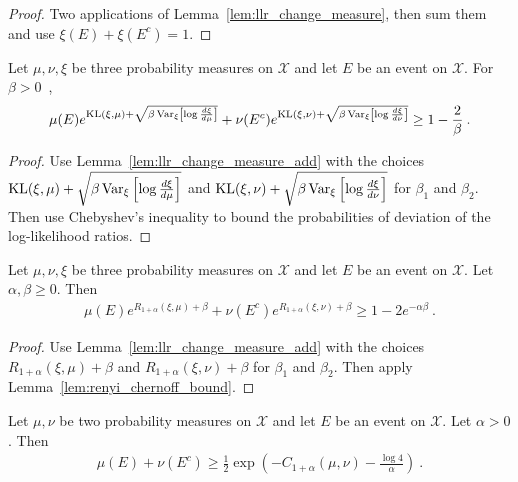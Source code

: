 \begin{proof}\leanok
{}
Two applications of Lemma~\ref{lem:llr_change_measure}, then sum them and use $\xi(E)+\xi(E^c) = 1$.
\end{proof}

\begin{lemma}
  \label{lem:change_measure_variance_add}
  \uses{}
  Let $\mu, \nu, \xi$ be three probability measures on $\mathcal X$ and let $E$ be an event on $\mathcal X$. For $\beta > 0$~,
  \begin{align*}
  \mu(E) e^{\operatorname{KL}(\xi, \mu) + \sqrt{\beta \operatorname{Var}_{\xi}\left[\log\frac{d\xi}{d\mu}\right]}} + \nu(E^c) e^{\operatorname{KL}(\xi, \nu) + \sqrt{\beta \operatorname{Var}_{\xi}\left[\log\frac{d\xi}{d\nu}\right]}}
  \ge 1 - \frac{2}{\beta} \: .
  \end{align*}
\end{lemma}

\begin{proof} %
{}
Use Lemma~\ref{lem:llr_change_measure_add} with the choices $\operatorname{KL}(\xi, \mu) + \sqrt{\beta \operatorname{Var}_{\xi}\left[\log\frac{d\xi}{d\mu}\right]}$ and $\operatorname{KL}(\xi, \nu) + \sqrt{\beta \operatorname{Var}_{\xi}\left[\log\frac{d\xi}{d\nu}\right]}$ for $\beta_1$ and $\beta_2$.
Then use Chebyshev's inequality to bound the probabilities of deviation of the log-likelihood ratios.
\end{proof}

\begin{lemma}
  \label{lem:renyi_change_measure_add}
  \leanok
  Let $\mu, \nu, \xi$ be three probability measures on $\mathcal X$ and let $E$ be an event on $\mathcal X$. Let $\alpha, \beta \ge 0$. Then
  \begin{align*}
  \mu(E) e^{R_{1+\alpha}(\xi, \mu) + \beta} + \nu(E^c) e^{R_{1+\alpha}(\xi, \nu) + \beta} \ge 1 - 2 e^{-\alpha \beta} \: .
  \end{align*}
\end{lemma}

\begin{proof}\leanok
{}
Use Lemma~\ref{lem:llr_change_measure_add} with the choices $R_{1+\alpha}(\xi, \mu) + \beta$ and $R_{1+\alpha}(\xi, \nu) + \beta$ for $\beta_1$ and $\beta_2$.
Then apply Lemma~\ref{lem:renyi_chernoff_bound}.
\end{proof}


\begin{lemma}
  \label{lem:testing_bound_renyi_one_add}
  \leanok
  Let $\mu, \nu$ be two probability measures on $\mathcal X$ and let $E$ be an event on $\mathcal X$. Let $\alpha > 0$. Then
  \begin{align*}
  \mu(E) + \nu(E^c) \ge \frac{1}{2}\exp\left( - C_{1+\alpha}(\mu, \nu) - \frac{\log 4}{\alpha}\right) \: .
  \end{align*}
\end{lemma}

